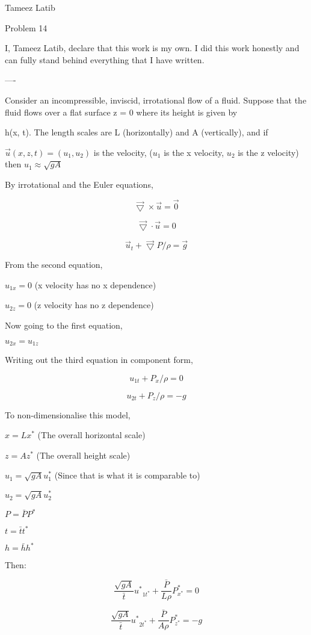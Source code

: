 \documentclass{article}
\begin{document}
Tameez Latib

Problem 14

I, Tameez Latib, declare that this work is my own. I did this work honestly and can fully stand behind everything that I have written.

----

Consider an incompressible, inviscid, irrotational flow of a fluid. Suppose that the fluid flows over a flat surface z = 0 where its height is given by

 h(x, t). The length scales are L (horizontally) and A (vertically), and if

$\vec{u}(x, z, t) = (u_1, u_2)$ is the velocity, ($u_1$ is the x velocity, $u_2$ is the z velocity) then $u_1 \approx \sqrt{gA}$  

By irrotational and the Euler equations, 

$$\vec{\bigtriangledown} \times \vec{u} = \vec{0} $$

$$\vec{\bigtriangledown} \cdot \vec{u} = 0 $$

$$\vec{u}_t + \vec{\bigtriangledown} P/{\rho}  = \vec{g} $$

From the second equation, 

$u_{1x} = 0$ (x velocity has no x dependence)

$u_{2z} = 0$ (z velocity has no z dependence) 

Now going to the first equation, 

$u_{2x} = u_{1z}$

Writing out the third equation in component form, 

$${u}_{1t} +  P_x/{\rho}  = 0   $$

$${u}_{2t} +  P_z/{\rho}  = -g$$

To non-dimensionalise this model, 

$x = Lx^*$ (The overall horizontal scale)

$z = Az^*$ (The overall height scale)

$u_1 = \sqrt{gA} u_1^*$  (Since that is what it is comparable to)

$u_2 = \sqrt{gA} u_2^*$  

$P = \bar{P} P^*$  

$t = \bar{t} t^*$  

$h =  \bar{h}h^*$  

Then: 

$$ \frac{\sqrt{gA}}{\bar{t}} {u^*}_{1t^*} +  \frac{\bar{P}}{L \rho}P^*_{x^*}  = 0   $$

$$ \frac{\sqrt{gA}} {\bar{t}} {u^*}_{2t^*} +  \frac{\bar{P}}{A \rho}P^*_{z^*}  = -g   $$
\end{document}
